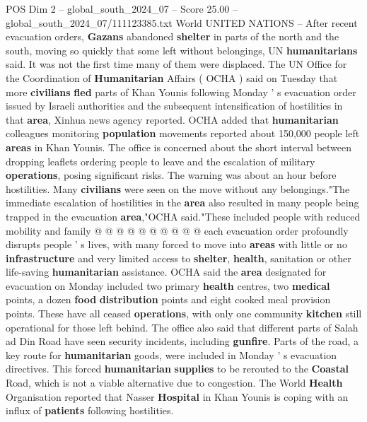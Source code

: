 \begin{textsample}{POS Dim 2 – global\_south\_2024\_07 – Score 25.00 – global\_south\_2024\_07/111123385.txt}  \label{ex:f2_pos_167}
World UNITED NATIONS -- After recent evacuation orders, \textbf{Gazans} abandoned \textbf{shelter} in parts of the north and the south, moving so quickly that some left without belongings, UN \textbf{humanitarians} said.
It was not the first time many of them were displaced.
The UN Office for the Coordination of \textbf{Humanitarian} Affairs ( OCHA ) said on Tuesday that more \textbf{civilians} \textbf{fled} parts of Khan Younis following Monday ' s evacuation order issued by Israeli authorities and the subsequent intensification of hostilities in that \textbf{area}, Xinhua news agency reported.
OCHA added that \textbf{humanitarian} colleagues monitoring \textbf{population} movements reported about 150,000 people left \textbf{areas} in Khan Younis.
The office is concerned about the short interval between dropping leaflets ordering people to leave and the escalation of military \textbf{operations}, posing significant risks.
The warning was about an hour before hostilities.
Many \textbf{civilians} were seen on the move without any belongings."The immediate escalation of hostilities in the \textbf{area} also resulted in many people being trapped in the evacuation \textbf{area},"OCHA said."These included people with reduced mobility and family @ @ @ @ @ @ @ @ @ @ each evacuation order profoundly disrupts people ' s lives, with many forced to move into \textbf{areas} with little or no \textbf{infrastructure} and very limited access to \textbf{shelter}, \textbf{health}, sanitation or other life-saving \textbf{humanitarian} assistance.
OCHA said the \textbf{area} designated for evacuation on Monday included two primary \textbf{health} centres, two \textbf{medical} points, a dozen \textbf{food} \textbf{distribution} points and eight cooked meal provision points.
These have all ceased \textbf{operations}, with only one community \textbf{kitchen} still operational for those left behind.
The office also said that different parts of Salah ad Din Road have seen security incidents, including \textbf{gunfire}.
Parts of the road, a key route for \textbf{humanitarian} goods, were included in Monday ' s evacuation directives.
This forced \textbf{humanitarian} \textbf{supplies} to be rerouted to the \textbf{Coastal} Road, which is not a viable alternative due to congestion.
The World \textbf{Health} Organisation reported that Nasser \textbf{Hospital} in Khan Younis is coping with an influx of \textbf{patients} following hostilities.

\end{textsample}
